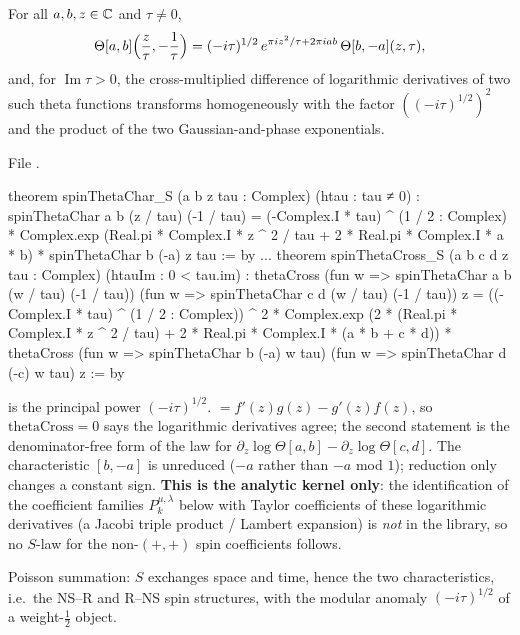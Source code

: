 \begin{theorem}\label{l17:thm:thetaS}
For all $a,b,z\in{\mathbb{C}}$ and $\tau\neq0$,
\begin{equation*}
\Theta[a,b]\Bigl(\frac z\tau,-\frac1\tau\Bigr)=(-i\tau)^{1/2}\,e^{\pi iz^2/\tau+2\pi iab}\,\Theta[b,-a](z,\tau),
\end{equation*}
and, for $\operatorname{Im}\tau>0$, the cross-multiplied difference of logarithmic derivatives of two
such theta functions transforms homogeneously with the factor $((-i\tau)^{1/2})^2$ and the product of
the two Gaussian-and-phase exponentials.
\end{theorem}
\noindent File .
\begin{leancode}
theorem spinThetaChar_S (a b z tau : Complex) (htau : tau ≠ 0) :
    spinThetaChar a b (z / tau) (-1 / tau) =
      (-Complex.I * tau) ^ (1 / 2 : Complex) *
        Complex.exp (Real.pi * Complex.I * z ^ 2 / tau +
          2 * Real.pi * Complex.I * a * b) * spinThetaChar b (-a) z tau := by
...
theorem spinThetaCross_S
    (a b c d z tau : Complex) (htauIm : 0 < tau.im) :
    thetaCross
        (fun w => spinThetaChar a b (w / tau) (-1 / tau))
        (fun w => spinThetaChar c d (w / tau) (-1 / tau)) z =
      ((-Complex.I * tau) ^ (1 / 2 : Complex)) ^ 2 *
        Complex.exp (2 * (Real.pi * Complex.I * z ^ 2 / tau) +
          2 * Real.pi * Complex.I * (a * b + c * d)) *
        thetaCross (fun w => spinThetaChar b (-a) w tau)
          (fun w => spinThetaChar d (-c) w tau) z := by
\end{leancode}
\begin{dictionary}
 is the principal power $(-i\tau)^{1/2}$.
 $=f'(z)g(z)-g'(z)f(z)$, so $\mathrm{thetaCross}=0$ says the logarithmic
derivatives agree; the second statement is the denominator-free form of the law for
$\partial_z\log\Theta[a,b]-\partial_z\log\Theta[c,d]$. The characteristic $[b,-a]$ is unreduced
($-a$ rather than $-a$ mod $1$); reduction only changes a constant sign. \textbf{This is the analytic
kernel only}: the identification of the coefficient families $P^{\mu,\lambda}_k$ below with Taylor
coefficients of these logarithmic derivatives (a Jacobi triple product / Lambert expansion) is
\emph{not} in the library, so no $S$-law for the non-$(+,+)$ spin coefficients follows.
\end{dictionary}
\begin{physics}
Poisson summation: $S$ exchanges space and time, hence the two characteristics, i.e.\ the NS--R and
R--NS spin structures, with the modular anomaly $(-i\tau)^{1/2}$ of a weight-$\frac12$ object.
\end{physics}
